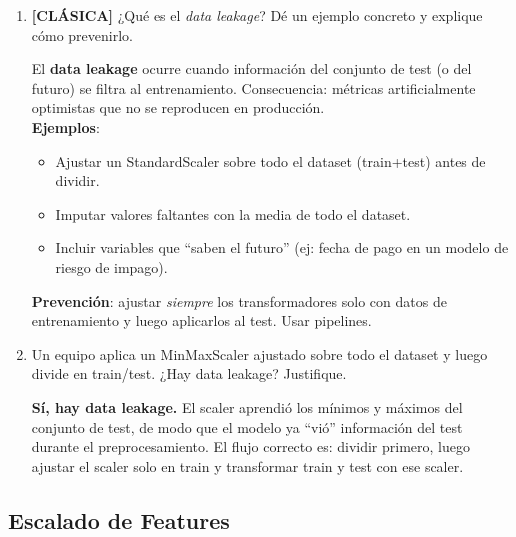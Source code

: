 \documentclass[11pt,a4paper]{article}
\begin{document}
\begin{enumerate}[label=\textbf{P\arabic*.}, resume]

\item \leavevmode

\begin{classicbox}
\textcolor{tdred}{\textbf{[CL\'ASICA]}} ¿Qu\'e es el \textit{data leakage}? D\'e un
ejemplo concreto y explique c\'omo prevenirlo.
\end{classicbox}

\begin{answerbox}
El \textbf{data leakage} ocurre cuando informaci\'on del conjunto de test (o del futuro)
se filtra al entrenamiento. Consecuencia: m\'etricas artificialmente optimistas que no
se reproducen en producci\'on.\\[4pt]
\textbf{Ejemplos}:
\begin{itemize}[topsep=2pt, itemsep=2pt]
  \item Ajustar un StandardScaler sobre todo el dataset (train+test) antes de dividir.
  \item Imputar valores faltantes con la media de todo el dataset.
  \item Incluir variables que ``saben el futuro'' (ej: fecha de pago en un modelo de riesgo de impago).
\end{itemize}
\textbf{Prevenci\'on}: ajustar \emph{siempre} los transformadores solo con datos de
entrenamiento y luego aplicarlos al test. Usar pipelines.
\end{answerbox}

\item Un equipo aplica un MinMaxScaler ajustado sobre todo el dataset y luego divide en
  train/test. ¿Hay data leakage? Justifique.

\begin{answerbox}
\textbf{S\'i, hay data leakage.} El scaler aprendi\'o los m\'inimos y m\'aximos del
conjunto de test, de modo que el modelo ya ``vi\'o'' informaci\'on del test durante el
preprocesamiento. El flujo correcto es: dividir primero, luego ajustar el scaler solo
en train y transformar train y test con ese scaler.
\end{answerbox}

\end{enumerate}

\subsection{Escalado de Features}
\end{document}

